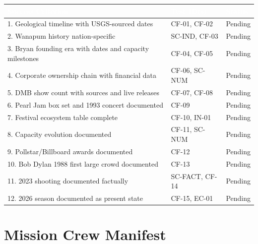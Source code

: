 \documentclass[11pt,letterpaper]{article}
\newcommand{\tableheader}[1]{\textbf{\sffamily\textcolor{white}{#1}}}
\begin{document}
\begin{center}
\begin{tabularx}{\textwidth}{XL{3.5cm}C{1.5cm}}
\toprule
{}
\tableheader{Success Criterion} & \tableheader{Test ID(s)} & \tableheader{Status} \\
. Geological timeline with USGS-sourced dates & CF-01, CF-02 & Pending \\
2. Wanapum history nation-specific & SC-IND, CF-03 & Pending \\
3. Bryan founding era with dates and capacity milestones & CF-04, CF-05 & Pending \\
4. Corporate ownership chain with financial data & CF-06, SC-NUM & Pending \\
5. DMB show count with sources and live releases & CF-07, CF-08 & Pending \\
6. Pearl Jam box set and 1993 concert documented & CF-09 & Pending \\
7. Festival ecosystem table complete & CF-10, IN-01 & Pending \\
8. Capacity evolution documented & CF-11, SC-NUM & Pending \\
9. Pollstar/Billboard awards documented & CF-12 & Pending \\
10. Bob Dylan 1988 first large crowd documented & CF-13 & Pending \\
11. 2023 shooting documented factually & SC-FACT, CF-14 & Pending \\
12. 2026 season documented as present state & CF-15, EC-01 & Pending \\
\bottomrule
\end{tabularx}
\end{center}

\section{Mission Crew Manifest}
\end{document}
